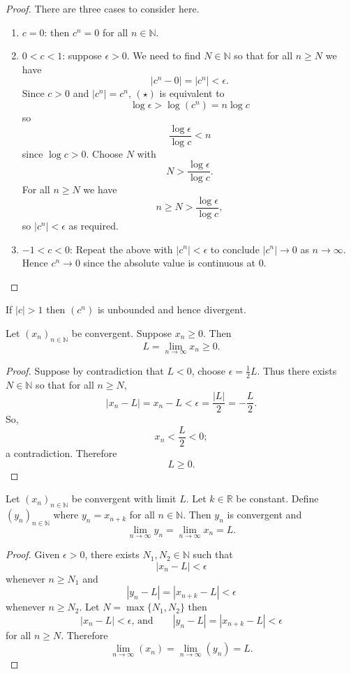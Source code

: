 \begin{proof}
    There are three cases to consider here.
    \begin{enumerate}
        \item $c=0$: then $c^n=0$ for all $n\in\mathbb N$.
        \item $0<c<1$: suppose $\epsilon>0$. We need to find $N\in\mathbb N$ so that for all $n\geq N$ we have \[|c^n-0|=|c^n|<\epsilon\tag{$\star$}.\] Since $c>0$ and $|c^n|=c^n$, $(\star)$ is equivalent to \[\log{\epsilon}>\log(c^n)=n\log c\] so \[\dfrac{\log\epsilon}{\log c}<n\] since $\log{c}>0$. Choose $N$ with \[N>\dfrac{\log\epsilon}{\log c}.\] For all $n\geq N$  we have \[n\geq N>\dfrac{\log\epsilon}{\log c},\] so $|c^n|<\epsilon$ as required.
        \item $-1<c<0$: Repeat the above with $|c^n|<\epsilon$ to conclude $|c^n|\to0$ as $n\to\infty$. Hence $c^n\to0$ since the absolute value is continuous at $0$.
    \end{enumerate}
\end{proof}

\begin{remark}
    If $|c|>1$ then $(c^n)$ is unbounded and hence divergent.
\end{remark}

\begin{proposition}
    Let $(x_n)_{n\in\mathbb N}$ be convergent. Suppose $x_n\geq 0$. Then \[L=\lim_{n\to\infty}x_n\geq0.\]
\end{proposition}

\begin{proof}
    Suppose by contradiction that $L<0$, choose $\epsilon=\frac12L$. Thus there exists $N\in\mathbb N$ so that for all $n\geq N$, \[|x_n-L|=x_n-L<\epsilon=\dfrac{|L|}2=-\dfrac L2.\] So, \[x_n<\dfrac L2<0;\] a contradiction. Therefore \[L\geq0.\]
\end{proof}

\begin{proposition}\label{pro:indexed_convergent_sequence}
    Let $(x_n)_{n\in\mathbb N}$ be convergent with limit $L$. Let $k\in\mathbb R$ be constant. Define $(y_n)_{n\in\mathbb N}$ where $y_n=x_{n+k}$ for all $n\in\mathbb N$. Then $y_n$ is convergent and \[\lim_{n\to\infty}y_n=\lim_{n\to\infty}x_n=L.\]
\end{proposition}

\begin{proof}
    Given $\epsilon>0$, there exists $N_1,N_2\in\mathbb N$ such that \[|x_n-L|<\epsilon\] whenever $n\geq N_1$ and \[|y_n-L|=|x_{n+k}-L|<\epsilon\] whenever $n\geq N_2$. Let $N=\max\{N_1,N_2\}$ then \[|x_n-L|<\epsilon,\,\text{and}\qquad|y_n-L|=|x_{n+k}-L|<\epsilon\] for all $n\geq N$. Therefore \[\lim_{n\to\infty}(x_n)=\lim_{n\to\infty}(y_n)=L.\]
\end{proof}


